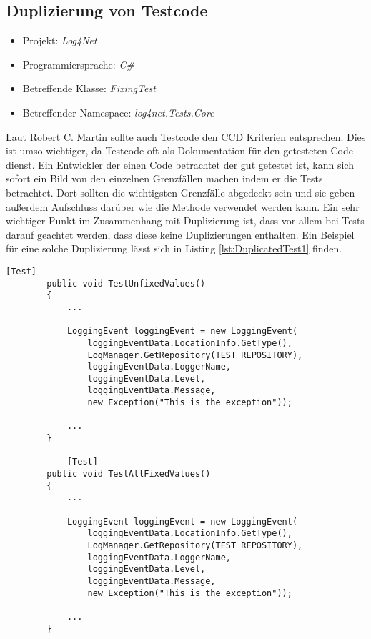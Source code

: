 \subsection{Duplizierung von Testcode}
\begin{itemize}
	\item Projekt: \textit{Log4Net}
	\item Programmiersprache: \textit{C\#}
	\item Betreffende Klasse: \textit{FixingTest}
	\item Betreffender Namespace: \textit{log4net.Tests.Core}
\end{itemize}
\SuperPar Laut Robert C. Martin sollte auch Testcode den CCD Kriterien entsprechen. Dies ist umso wichtiger, da Testcode oft als Dokumentation für den getesteten Code dienst. Ein Entwickler der einen Code betrachtet der gut getestet ist, kann sich sofort ein Bild von den einzelnen Grenzfällen machen indem er die Tests betrachtet. Dort sollten die wichtigsten Grenzfälle abgedeckt sein und sie geben außerdem Aufschluss darüber wie die Methode verwendet werden kann. Ein sehr wichtiger Punkt im Zusammenhang mit Duplizierung ist, dass vor allem bei Tests darauf geachtet werden, dass diese keine Duplizierungen enthalten. Ein Beispiel für eine solche Duplizierung lässt sich in Listing \ref{lst:DuplicatedTest1} finden.


\begin{lstlisting}[language={[Sharp]C}, caption=Beispiele für Duplizierung in Tests, label=lst:DuplicatedTest1]
		[Test]
		public void TestUnfixedValues()
		{
			...
			
			LoggingEvent loggingEvent = new LoggingEvent(
				loggingEventData.LocationInfo.GetType(),
				LogManager.GetRepository(TEST_REPOSITORY),
				loggingEventData.LoggerName,
				loggingEventData.Level,
				loggingEventData.Message,
				new Exception("This is the exception"));
			
			...
		}
		
			[Test]
		public void TestAllFixedValues()
		{
			...
			
			LoggingEvent loggingEvent = new LoggingEvent(
				loggingEventData.LocationInfo.GetType(),
				LogManager.GetRepository(TEST_REPOSITORY),
				loggingEventData.LoggerName,
				loggingEventData.Level,
				loggingEventData.Message,
				new Exception("This is the exception"));

			...
		}
\end{lstlisting}

